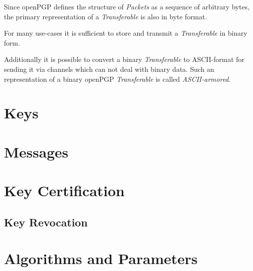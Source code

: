 Since openPGP defines the structure of \textit{Packets} as a sequence of arbitrary bytes, the primary representation of a \textit{Transferable} is also in byte format.

For many use-cases it is sufficient to store and transmit a \textit{Transferable} in binary form.

Additionally it is possible to convert a binary \textit{Transferable} to ASCII-format for sending it  via channels which can not deal with binary data. Such an representation of a binary openPGP \textit{Transferable} is called \textit{ASCII-armored}.


\section{Keys}

\section{Messages}




\section{Key Certification}


\subsection{Key Revocation}


\section{Algorithms and Parameters}


